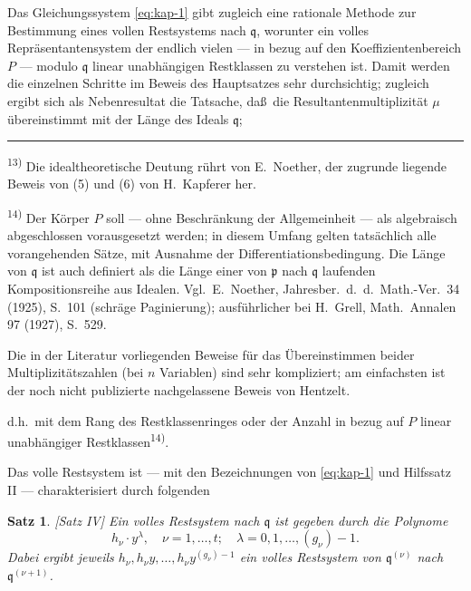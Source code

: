 \documentclass[12pt,a4paper]{article}
\theoremstyle{plain}
\newtheorem{satz}{Satz}[section]
\theoremstyle{definition}
\theoremstyle{remark}
\begin{document}
Das Gleichungssystem \eqref{eq:kap-1} gibt zugleich eine rationale
Methode zur Bestimmung eines vollen Restsystems nach
$\mathfrak{q}$, worunter ein volles Repr\"asentantensystem der endlich
vielen --- in bezug auf den Koeffizientenbereich $P$ --- modulo
$\mathfrak{q}$ linear unabh\"angigen Restklassen zu verstehen ist. Damit
werden die einzelnen Schritte im Beweis des Hauptsatzes sehr
durchsichtig; zugleich ergibt sich als Nebenresultat die Tatsache,
da\ss\ die Resultantenmultiplizit\"at $\mu$ \"ubereinstimmt mit der
L\"ange des Ideals $\mathfrak{q}$;

\vspace{0.5em}
\noindent\rule{\textwidth}{0.4pt}
\vspace{0.3em}

{\footnotesize
\textsuperscript{13)} Die idealtheoretische Deutung r\"uhrt von E.\ Noether, der zugrunde liegende
Beweis von (5) und (6) von H.\ Kapferer her.

\textsuperscript{14)} Der K\"orper $P$ soll --- ohne Beschr\"ankung der Allgemeinheit --- als
algebraisch abgeschlossen vorausgesetzt werden; in diesem Umfang gelten
tats\"achlich alle vorangehenden S\"atze, mit Ausnahme der
Differentiationsbedingung. Die L\"ange von $\mathfrak{q}$ ist auch definiert als
die L\"ange einer von $\mathfrak{p}$ nach $\mathfrak{q}$ laufenden Kompositionsreihe aus Idealen.
Vgl.\ E.\ Noether, Jahresber.\ d.\ d.\ Math.-Ver.\ 34 (1925), S.~101
(schr\"age Paginierung); ausf\"uhrlicher bei H.\ Grell, Math.\ Annalen 97
(1927), S.~529.

Die in der Literatur vorliegenden Beweise f\"ur das \"Ubereinstimmen
beider Multiplizit\"atszahlen (bei $n$ Variablen) sind sehr kompliziert;
am einfachsten ist der noch nicht publizierte nachgelassene Beweis von
Hentzelt.
}

\vspace{1em}
d.h.\ mit dem Rang des Restklassenringes oder der Anzahl in bezug
auf $P$ linear unabh\"angiger Restklassen\textsuperscript{14)}.

Das volle Restsystem ist --- mit den Bezeichnungen von
\eqref{eq:kap-1} und Hilfssatz II --- charakterisiert durch folgenden

\begin{satz}\label{satz:kap-IV}[Satz IV]
Ein volles Restsystem nach $\mathfrak{q}$ ist gegeben durch die Polynome
\[
h_{\nu} \cdot y^{\lambda}, \quad \nu = 1, \ldots, t; \quad \lambda = 0, 1, \ldots, (g_{\nu})-1.
\]
Dabei ergibt jeweils $h_{\nu}, h_{\nu}y, \ldots, h_{\nu}y^{(g_{\nu})-1}$ ein
volles Restsystem von $\mathfrak{q}^{(\nu)}$ nach $\mathfrak{q}^{(\nu+1)}$.
\end{satz}
\end{document}
